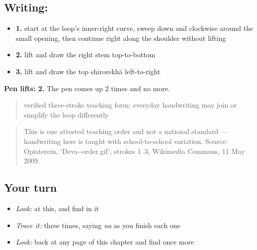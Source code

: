 \subsection*{Writing: }

\begin{itemize}
\raggedright
  \item \textbf{1.} start at the loop's inner-right curve, sweep down and clockwise around the small opening, then continue right along the shoulder without lifting
  \item \textbf{2.} lift and draw the right stem top-to-bottom
  \item \textbf{3.} lift and draw the top shirorekhā left-to-right
\end{itemize}

\textbf{Pen lifts: 2.} The pen comes up 2 times and no more.

\begin{quote}
verified three-stroke teaching form; everyday handwriting may join or simplify the loop differently
\end{quote}

\begin{quote}
This is one attested teaching order and not a national standard — handwriting here is taught with school-to-school variation. Source: Opiaterein, ‘Deva--order.gif’, strokes 1–3, Wikimedia Commons, 11 May 2009.
\end{quote}

\subsection*{Your turn}
\begin{itemize}
\raggedright
  \item \emph{Look:} at this, and find  in it
\end{itemize}

\begin{quote}
\end{quote}

\begin{itemize}
\raggedright
  \item \emph{Trace it:}  three times, saying \emph{na} as you finish each one
  \item \emph{Look:} back at any page of this chapter and find  once more
\end{itemize}

